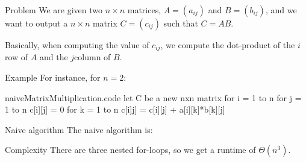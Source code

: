 \documentclass[a4paper]{article}
\begin{document}
\begin{parag}{Problem}
    We are given two $n \times n$ matrices, $A = \left(a_{ij}\right)$ and $B = \left(b_{ij}\right)$, and we want to output a $n \times n$ matrix $C = \left(c_{ij}\right)$ such that $C = AB$.

    Basically, when computing the value of $c_{ij}$, we compute the dot-product of the $i$\Th row of $A$ and the $j$\Th column of $B$.

    \begin{subparag}{Example}
        For instance, for $n = 2$: 
    \end{subparag}
\end{parag}

\begin{filecontents*}[overwrite]{naiveMatrixMultiplication.code}
let C be a new nxn matrix
for i = 1 to n
    for j = 1 to n
            c[i][j] = 0
            for k = 1 to n
                c[i]j] = c[i][j] + a[i][k]*b[k][j]
\end{filecontents*}

\begin{parag}{Naive algorithm}
    The naive algorithm is:
    
    \begin{subparag}{Complexity}
        There are three nested for-loops, so we get a runtime of $\Theta\left(n^3\right)$.
    \end{subparag}
\end{parag}
\end{document}
